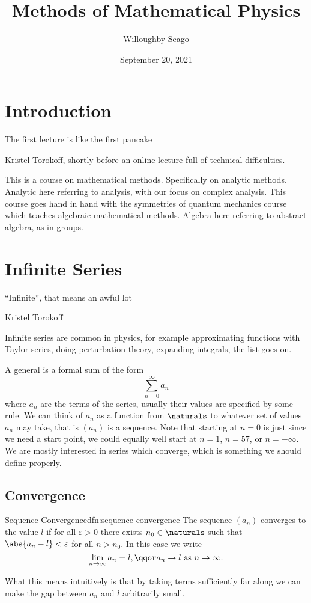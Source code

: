 \documentclass[fleqn]{NotesClass}
\title{Methods of Mathematical Physics}
\author{Willoughby Seago}
\date{September 20, 2021}
\begin{document}
    \frontmatter
    \titlepage
    \tableofcontents
    \mainmatter
    
    \chapter{Introduction}
    \epigraph{The first lecture is like the first pancake}{Kristel Torokoff, shortly before an online lecture full of technical difficulties.}
    This is a course on mathematical methods.
    Specifically on analytic methods.
    Analytic here referring to analysis, with our focus on complex analysis.
    This course goes hand in hand with the symmetries of quantum mechanics course which teaches algebraic mathematical methods.
    Algebra here referring to abstract algebra, as in groups.
    
    \chapter{Infinite Series}
    \epigraph{\enquote{Infinite}, that means an awful lot}{Kristel Torokoff}
    Infinite series are common in physics, for example approximating functions with Taylor series, doing perturbation theory, expanding integrals, the list goes on.
    
    A general  is a formal sum of the form
    \begin{equation}
        \sum_{n=0}^{\infty} a_n
    \end{equation}
    where \(a_n\) are the terms of the series, usually their values are specified by some rule.
    We can think of \(a_n\) as a function from \(\naturals\) to whatever set of values \(a_n\) may take, that is \((a_n)\) is a sequence.
    Note that starting at \(n = 0\) is just since we need a start point, we could equally well start at \(n = 1\), \(n = 57\), or \(n = -\infty\).
    We are mostly interested in series which converge, which is something we should define properly.
    
    \section{Convergence}
    \begin{dfn}{Sequence Convergence}{dfn:sequence convergence}
        The sequence \((a_n)\) converges to the value \(l\) if for all \(\varepsilon>0\) there exists \(n_0\in\naturals\) such that \(\abs{a_n - l} < \varepsilon\) for all \(n > n_0\).
        In this case we write
        \begin{equation}
            \lim_{n\to\infty} a_n = l, \qqor a_n \to l\text{ as } n\to\infty.
        \end{equation}
    \end{dfn}
    What this means intuitively is that by taking terms sufficiently far along we can make the gap between \(a_n\) and \(l\) arbitrarily small.
    
\end{document}
